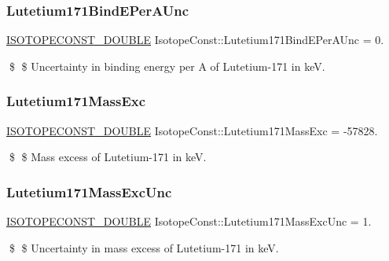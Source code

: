 \subsubsection{\texorpdfstring{Lutetium171\+Bind\+E\+Per\+A\+Unc}{Lutetium171BindEPerAUnc}}
{\footnotesize\ttfamily \mbox{\hyperlink{group___isotope_const-_macros_ga8f45a7272ce02c0b4c65c44636ed719a}{I\+S\+O\+T\+O\+P\+E\+C\+O\+N\+S\+T\+\_\+\+D\+O\+U\+B\+LE}} Isotope\+Const\+::\+Lutetium171\+Bind\+E\+Per\+A\+Unc = 0.}

\$ \$ Uncertainty in binding energy per A of Lutetium-\/171 in keV. \mbox{\label{group___isotope_const-_lutetium-_lu171_ga597007acb831055c7ab1c3a70e85be1d}} 
\subsubsection{\texorpdfstring{Lutetium171\+Mass\+Exc}{Lutetium171MassExc}}
{\footnotesize\ttfamily \mbox{\hyperlink{group___isotope_const-_macros_ga8f45a7272ce02c0b4c65c44636ed719a}{I\+S\+O\+T\+O\+P\+E\+C\+O\+N\+S\+T\+\_\+\+D\+O\+U\+B\+LE}} Isotope\+Const\+::\+Lutetium171\+Mass\+Exc = -\/57828.}

\$ \$ Mass excess of Lutetium-\/171 in keV. \mbox{\label{group___isotope_const-_lutetium-_lu171_ga2c05433a6e2aa5bfe0e35e676e2f8202}} 
\subsubsection{\texorpdfstring{Lutetium171\+Mass\+Exc\+Unc}{Lutetium171MassExcUnc}}
{\footnotesize\ttfamily \mbox{\hyperlink{group___isotope_const-_macros_ga8f45a7272ce02c0b4c65c44636ed719a}{I\+S\+O\+T\+O\+P\+E\+C\+O\+N\+S\+T\+\_\+\+D\+O\+U\+B\+LE}} Isotope\+Const\+::\+Lutetium171\+Mass\+Exc\+Unc = 1.}

\$ \$ Uncertainty in mass excess of Lutetium-\/171 in keV. \mbox{\label{group___isotope_const-_lutetium-_lu171_gaccbfbf20b451b7e68a9701cbc9adf932}} 
